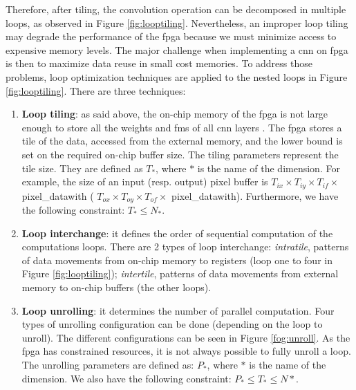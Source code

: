 Therefore, after tiling, the convolution operation can be decomposed in multiple loops, as observed in Figure \ref{fig:looptiling}. Nevertheless, an improper loop tiling may degrade the performance of the \acrshort{fpga} because we must minimize access to expensive memory levels. The major challenge when implementing a \acrshort{cnn} on \acrshort{fpga} is then to maximize data reuse in small cost memories. To address those problems, loop optimization techniques are applied to the nested loops in Figure \ref{fig:looptiling}. There are three techniques:
%
\begin{enumerate}
    \item \textbf{Loop tiling}: as said above, the on-chip memory of the \acrshort{fpga} is not large enough to store all the weights and \acrshort{fm}s of all \acrshort{cnn} layers \cite{abdelouahab_accelerating_2018}. The \acrshort{fpga} stores a tile of the data, accessed from the external memory, and the lower bound is set on the required on-chip buffer size. The tiling parameters represent the tile size. They are defined as $T_{*}$, where $*$ is the name of the dimension. For example, the size of an input (resp. output) pixel buffer is $T_{ix} \times T_{iy} \times T_{if} \times $ pixel\_datawith ( $ T_{ox} \times T_{oy} \times T_{of} \times $ pixel\_datawith). Furthermore, we have the following constraint: $T_{*} \leq N_{*}$.
    \item \textbf{Loop interchange}: it defines the order of sequential computation of the computations loops. There are 2 types of loop interchange: \textit{intratile}, patterns of data movements from on-chip memory to registers (loop one to four in Figure \ref{fig:looptiling}); \textit{intertile}, patterns of data movements from external memory to on-chip buffers (the other loops).
    \item \textbf{Loop unrolling}: it determines the number of parallel computation. Four types of unrolling configuration can be done (depending on the loop to unroll). The different configurations can be seen in Figure \ref{fog:unroll}. As the \acrshort{fpga} has constrained resources, it is not always possible to fully unroll a loop. The unrolling parameters are defined as: $P_{*}$, where $*$ is the name of the dimension. We also have the following constraint: $P_{*} \leq T_{*} \leq N{*}$.
\end{enumerate}
%
